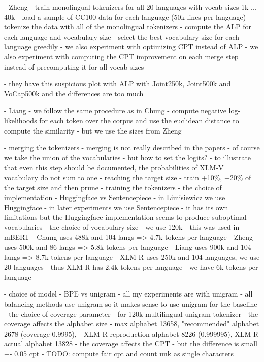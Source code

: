     - Zheng
        - train monolingual tokenizers for all 20 languages with vocab sizes 1k ... 40k
        - load a sample of CC100 data for each language (50k lines per language)
        - tokenize the data with all of the monolingual tokenizers
        - compute the ALP for each language and vocabulary size
        - select the best vocabulary size for each language greedily
        - we also experiment with optimizing CPT instead of ALP
        - we also experiment with computing the CPT improvement on each merge step instead of precomputing it for all vocab sizes

        - they have this suspicious plot with ALP with Joint250k, Joint500k and VoCap500k and the differences are too much

    - Liang
        - we follow the same procedure as in Chung
        - compute negative log-likelihoods for each token over the corpus and use the euclidean distance to compute the similarity
        - but we use the sizes from Zheng

    - merging the tokenizers
        - merging is not really described in the papers
        - of course we take the union of the vocabularies
        - but how to set the logits?
            - to illustrate that even this step should be documented, the probabilities of XLM-V vocabulary do not sum to one
    - reaching the target size
        - train +10\%, +20\% of the target size and then prune
- training the tokenizers
    - the choice of implementation
        - Huggingface vs Sentencepiece
            - in Limisiewicz we use Huggingface
            - in later experiments we use Sentencepiece
                - it has its own limitations but the Huggingface implementation seems to produce suboptimal vocabularies
    - the choice of vocabulary size
        - we use 120k
        - this was used in mBERT
        - Chung uses 488k and 104 langs => 4.7k tokens per language
        - Zheng uses 500k and 86 langs => 5.8k tokens per language
        - Liang uses 900k and 104 langs => 8.7k tokens per language
        - XLM-R uses 250k and 104 languages, we use 20 languages
            - thus XLM-R has 2.4k tokens per language
            - we have 6k tokens per language

    - choice of model - BPE vs unigram
        - all my experiments are with unigram
        - all balancing methods use unigram so it makes sense to use unigram for the baseline
    - the choice of coverage parameter
        - for 120k multilingual unigram tokenizer
            - the coverage affects the alphabet size 
                - max alphabet 13658, "recommended" alphabet 2678 (coverage 0.9995), 
                - XLM-R reproduction alphabet 8226 (0.999995), XLM-R actual alphabet 13828
            - the coverage affects the CPT
                - but the difference is small +- 0.05 cpt
                - TODO: compute fair cpt and count unk as single characters



